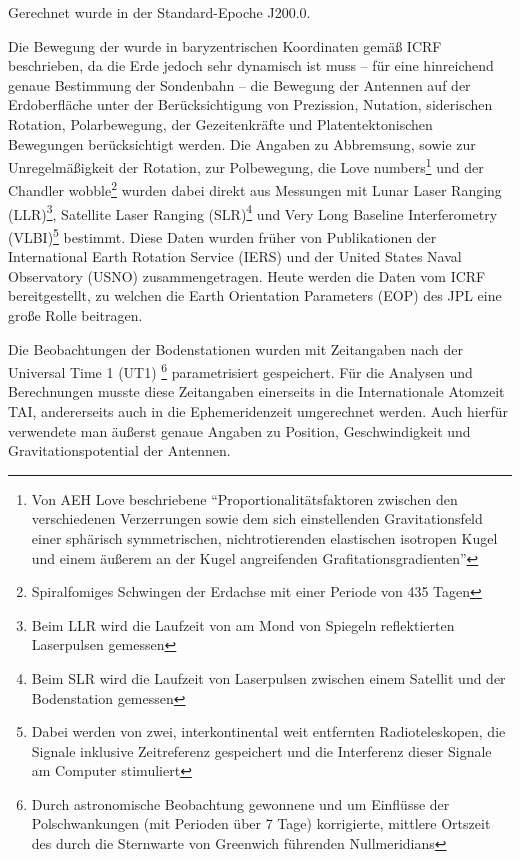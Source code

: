 Gerechnet wurde in der Standard-Epoche J200.0. %

Die Bewegung der wurde in baryzentrischen Koordinaten gemäß ICRF beschrieben, %
da die Erde jedoch sehr dynamisch ist muss – für eine hinreichend genaue Bestimmung der Sondenbahn –
die Bewegung der Antennen auf der Erdoberfläche unter der Berücksichtigung von Prezission, Nutation,
siderischen Rotation, Polarbewegung, der Gezeitenkräfte und Platentektonischen Bewegungen berücksichtigt werden.
Die Angaben zu Abbremsung, sowie zur Unregelmäßigkeit der Rotation, zur Polbewegung, die Love numbers\footnote{Von AEH Love beschriebene ``Proportionalitätsfaktoren zwischen den verschiedenen Verzerrungen sowie dem sich einstellenden Gravitationsfeld einer sphärisch symmetrischen, nichtrotierenden elastischen isotropen Kugel und einem äußerem an der Kugel angreifenden Grafitationsgradienten''\cite{Dittus2006}} und der Chandler wobble\footnote{Spiralfomiges Schwingen
der Erdachse mit einer Periode von 435 Tagen} %
wurden dabei direkt aus Messungen mit Lunar Laser Ranging (LLR)\footnote{Beim LLR wird die Laufzeit von am Mond von Spiegeln reflektierten Laserpulsen gemessen},
Satellite Laser Ranging (SLR)\footnote{Beim SLR wird die Laufzeit von Laserpulsen zwischen einem Satellit und der Bodenstation gemessen} und Very Long Baseline Interferometry
(VLBI)\footnote{Dabei werden von zwei, interkontinental weit entfernten Radioteleskopen, die Signale inklusive
Zeitreferenz gespeichert und die Interferenz dieser Signale am Computer stimuliert} bestimmt.
Diese Daten wurden früher von Publikationen der International Earth Rotation Service (IERS) und der United States Naval Observatory (USNO) zusammengetragen. Heute werden die Daten vom ICRF bereitgestellt, zu welchen die Earth Orientation Parameters
(EOP) des JPL eine große Rolle beitragen.\cite{Anderson2002}

Die Beobachtungen der Bodenstationen wurden mit Zeitangaben nach der Universal Time 1 (UT1)
\footnote{Durch astronomische Beobachtung gewonnene und um Einflüsse der Polschwankungen (mit Perioden über 7 Tage) korrigierte, mittlere Ortszeit des durch die Sternwarte von Greenwich führenden Nullmeridians}
parametrisiert gespeichert. Für die Analysen und
Berechnungen musste diese Zeitangaben einerseits in die Internationale Atomzeit TAI, andererseits auch in die
Ephemeridenzeit umgerechnet werden. Auch hierfür verwendete man äußerst genaue Angaben zu Position, Geschwindigkeit und
Gravitationspotential der Antennen.\cite{Dittus2006}

